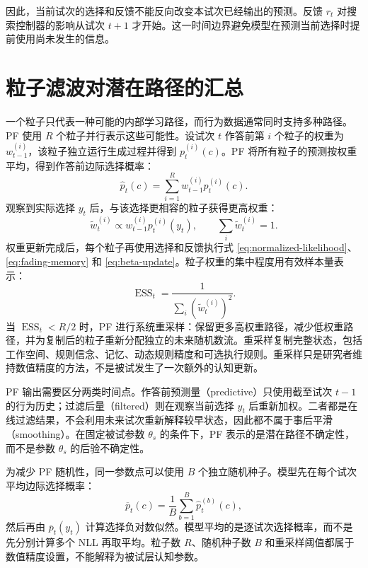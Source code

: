 \documentclass[12pt]{article}
\begin{document}
因此，当前试次的选择和反馈不能反向改变本试次已经输出的预测。反馈 $r_t$ 对搜索控制器的影响从试次 $t+1$ 才开始。这一时间边界避免模型在预测当前选择时提前使用尚未发生的信息。


\section{粒子滤波对潜在路径的汇总}

一个粒子只代表一种可能的内部学习路径，而行为数据通常同时支持多种路径。PF 使用 $R$ 个粒子并行表示这些可能性。设试次 $t$ 作答前第 $i$ 个粒子的权重为 $w_{t-1}^{(i)}$，该粒子独立运行生成过程并得到 $p_t^{(i)}(c)$。PF 将所有粒子的预测按权重平均，得到作答前边际选择概率：
\begin{equation}
\widehat p_t(c)
=\sum_{i=1}^{R}w_{t-1}^{(i)}p_t^{(i)}(c).
\label{eq:pf-predictive}
\end{equation}
观察到实际选择 $y_t$ 后，与该选择更相容的粒子获得更高权重：
\begin{equation}
\widetilde w_t^{(i)}
\propto
w_{t-1}^{(i)}p_t^{(i)}(y_t),
\qquad
\sum_i\widetilde w_t^{(i)}=1.
\label{eq:pf-weight-update}
\end{equation}
权重更新完成后，每个粒子再使用选择和反馈执行式 \eqref{eq:normalized-likelihood}、\eqref{eq:fading-memory} 和 \eqref{eq:beta-update}。粒子权重的集中程度用有效样本量表示：
\begin{equation}
\operatorname{ESS}_t
=\frac{1}{\sum_i(\widetilde w_t^{(i)})^2}.
\label{eq:ess}
\end{equation}
当 $\operatorname{ESS}_t<R/2$ 时，PF 进行系统重采样：保留更多高权重路径，减少低权重路径，并为复制后的粒子重新分配独立的未来随机数流。重采样复制完整状态，包括工作空间、规则信念、记忆、动态规则精度和可选执行规则。重采样只是研究者维持数值精度的方法，不是被试发生了一次额外的认知更新。

PF 输出需要区分两类时间点。作答前预测量（predictive）只使用截至试次 $t-1$ 的行为历史；过滤后量（filtered）则在观察当前选择 $y_t$ 后重新加权。二者都是在线过滤结果，不会利用未来试次重新解释较早状态，因此都不属于事后平滑（smoothing）。在固定被试参数 $\theta_s$ 的条件下，PF 表示的是潜在路径不确定性，而不是参数 $\theta_s$ 的后验不确定性。

为减少 PF 随机性，同一参数点可以使用 $B$ 个独立随机种子。模型先在每个试次平均边际选择概率：
\begin{equation}
\overline p_t(c)=\frac{1}{B}\sum_{b=1}^{B}\widehat p_t^{(b)}(c),
\label{eq:seed-aggregation}
\end{equation}
然后再由 $\overline p_t(y_t)$ 计算选择负对数似然。模型平均的是逐试次选择概率，而不是先分别计算多个 NLL 再取平均。粒子数 $R$、随机种子数 $B$ 和重采样阈值都属于数值精度设置，不能解释为被试层认知参数。
\end{document}
